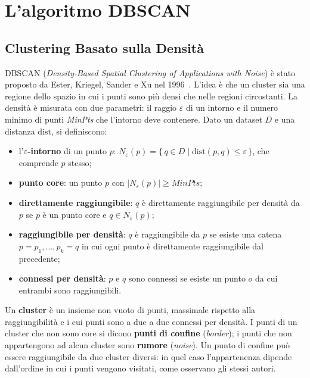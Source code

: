\chapter{L'algoritmo DBSCAN}
\label{cap:dbscan}

\section{Clustering Basato sulla Densità}

DBSCAN (\emph{Density-Based Spatial Clustering of Applications with Noise}) è stato proposto da Ester, Kriegel, Sander e Xu nel 1996~\cite{ester1996}. L'idea è che un cluster sia una regione dello spazio in cui i punti sono più densi che nelle regioni circostanti. La densità è misurata con due parametri: il raggio $\varepsilon$ di un intorno e il numero minimo di punti \textit{MinPts} che l'intorno deve contenere. Dato un dataset $D$ e una distanza $\mathrm{dist}$, si definiscono:

\begin{itemize}
    \item l'\textbf{$\varepsilon$-intorno} di un punto $p$: $N_\varepsilon(p) = \{\, q \in D \mid \mathrm{dist}(p, q) \le \varepsilon \,\}$, che comprende $p$ stesso;
    \item \textbf{punto core}: un punto $p$ con $|N_\varepsilon(p)| \ge \mathit{MinPts}$;
    \item \textbf{direttamente raggiungibile}: $q$ è direttamente raggiungibile per densità da $p$ se $p$ è un punto core e $q \in N_\varepsilon(p)$;
    \item \textbf{raggiungibile per densità}: $q$ è raggiungibile da $p$ se esiste una catena $p = p_1, \dots, p_k = q$ in cui ogni punto è direttamente raggiungibile dal precedente;
    \item \textbf{connessi per densità}: $p$ e $q$ sono connessi se esiste un punto $o$ da cui entrambi sono raggiungibili.
\end{itemize}

Un \textbf{cluster} è un insieme non vuoto di punti, massimale rispetto alla raggiungibilità e i cui punti sono a due a due connessi per densità. I punti di un cluster che non sono core si dicono \textbf{punti di confine} (\emph{border}); i punti che non appartengono ad alcun cluster sono \textbf{rumore} (\emph{noise}). Un punto di confine può essere raggiungibile da due cluster diversi: in quel caso l'appartenenza dipende dall'ordine in cui i punti vengono visitati, come osservano gli stessi autori.

